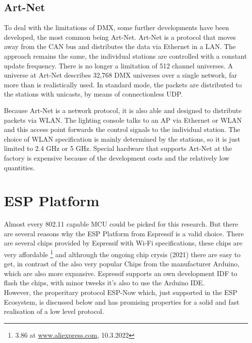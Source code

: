 \subsection*{Art-Net}
\label{sec:artnet}

To deal with the limitations of DMX, some further developments have been developed, the most common being Art-Net.
Art-Net is a protocol that moves away from the CAN bus and distributes the data via Ethernet in a \ac{LAN}.
The approach remains the same, the individual stations are controlled with a constant update frequency.
There is no longer a limitation of 512 channel universes.
A universe at Art-Net describes 32,768 DMX universes over a single network, far more than is realistically used.
In standard mode, the packets are distributed to the stations with unicasts, by means of connectionless \ac{UDP}.

Because Art-Net is a network protocol, it is also able and designed to distribute packets via WLAN.
The lighting console talks to an \ac{AP} via Ethernet or WLAN 
and this access point forwards the control signals to the individual station.
The choice of WLAN specification is mainly determined by the stations,
so it is just limited to 2.4 GHz or 5 GHz.
Special hardware that supports Art-Net at the factory is expensive
because of the development costs and the relatively low quantities.

\section{ESP Platform}

Almost every 802.11 capable \ac{MCU} could be picked for this research.
But there are several reasons why the ESP Platform from Espressif is a valid choice.
There are several chips provided by Espressif with Wi-Fi specifications, these chips are very affordable
\footnote{3.86 at \url{www.aliexpress.com}, 10.3.2022}
and althrough the ongoing chip crysis (2021) there are easy to get, in contrast of the also very popular Chips from the manufacturer Arduino, which are also more expansive.
Espressif supports an own development IDF to flash the chips, with minor tweeks it's also to use the Arduino IDE.\\
However, the properitary protocol ESP-Now which, just supported in the ESP Ecosystem, is discussed below
and has promising properties for a solid and fast realisation of a low level protocol.


